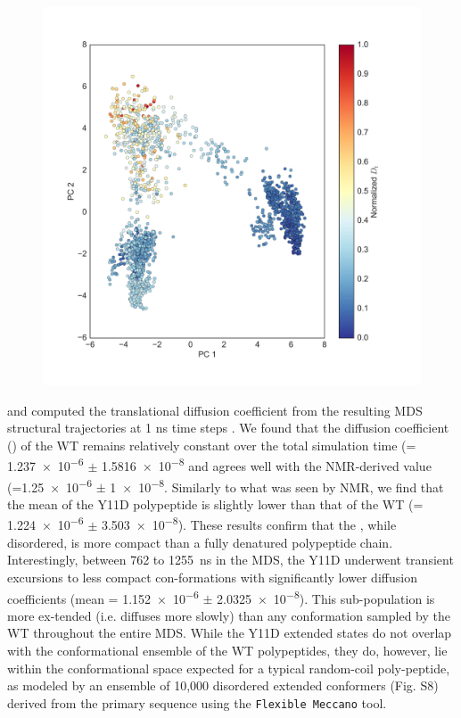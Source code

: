 \begin{figure}
\centering
\includegraphics[height=0.5\textheight]{figures/2d_scatter_yd.png}
\end{figure}

 and computed the translational diffusion coefficient from the resulting MDS structural trajectories at 1 ns time steps . We found that the diffusion coefficient (\diffusion) of the WT \gct{} remains relatively constant over the total simulation time (\diffusion = \num{1.237e-6} $\pm$ \SI{1.5816e-8}{\dcunits} and agrees well with the NMR-derived value (\diffusion=\num{1.25e-6} $\pm$  \SI{1e-8}{\dcunits}.  Similarly to what was seen by NMR, we find that the mean \diffusion of the Y11D \gct{} polypeptide is slightly lower than that of the WT \gct{} (\diffusion= \num{1.224e-6} $\pm$ \SI{3.503e-8}{\dcunits}). These results confirm that the \gct{}, while disordered, is more compact than a fully denatured polypeptide chain. Interestingly, between \num{762} to \SI{1255}{\ns} in the MDS, the Y11D \gct{} underwent transient excursions to less compact con-formations with significantly lower diffusion coefficients (mean \diffusion= \num{1.152e-6} $\pm$ \SI{2.0325e-8}{\dcunits}). This sub-population is more ex-tended (i.e. diffuses more slowly) than any conformation sampled by the WT \gct{} throughout the entire MDS. While the Y11D \gct{} extended states do not overlap with the conformational ensemble of the WT \gct{} polypeptides, they do, however, lie within the conformational space expected for a typical random-coil poly-peptide, as modeled by an ensemble of 10,000 disordered extended conformers (Fig. S8) derived from the \gct{} primary sequence using the \texttt{Flexible Meccano} tool.  

